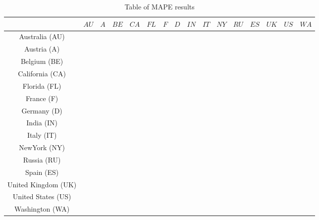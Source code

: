 \documentclass[letterpaper]{article}%
\begin{document}
\setlength\extrarowheight{5pt}
\begin{table}[!h]
	\caption{Table of MAPE results }
	\label{result}
	\begin{tabular}{cccccccccccccccc}
		   &$AU$&$A$&$BE$&$CA$&$FL$&$F$&$D$&$IN$&$IT$&$NY$&$RU$&$ES$&$UK$&$US$&$WA$\\
	\hline
		Australia (AU) &  &  &  &  &  &  &  &  &  &  &  &  &  & \\\hline
		Austria (A) &  &  &  &  &  &  &  &  &  &  &  &  &  & \\\hline
		Belgium (BE) &  &  &  &  &  &  &  &  &  &  &  &  &  & \\\hline
		California (CA) &  &  &  &  &  &  &  &  &  &  &  &  &  & \\\hline
		Florida (FL) &  &  &  &  &  &  &  &  &  &  &  &  &  & \\\hline
		France (F) &  &  &  &  &  &  &  &  &  &  &  &  &  & \\\hline
		Germany (D) &  &  &  &  &  &  &  &  &  &  &  &  &  & \\\hline
		India (IN) &  &  &  &  &  &  &  &  &  &  &  &  &  & \\\hline
		Italy (IT) &  &  &  &  &  &  &  &  &  &  &  &  &  & \\\hline
		NewYork (NY) &  &  &  &  &  &  &  &  &  &  &  &  &  & \\\hline
		Russia (RU) &  &  &  &  &  &  &  &  &  &  &  &  &  & \\\hline
		Spain (ES) &  &  &  &  &  &  &  &  &  &  &  &  &  & \\\hline
		United Kingdom (UK) &  &  &  &  &  &  &  &  &  &  &  &  &  & \\\hline
		United States (US) &  &  &  &  &  &  &  &  &  &  &  &  &  & \\\hline
		Washington (WA) &  &  &  &  &  &  &  &  &  &  &  &  &  & \\\hline
	\end{tabular}

	\label{tab:params}
\end{table}
\clearpage
\twocolumn
\clearpage
\onecolumn
\end{document}
